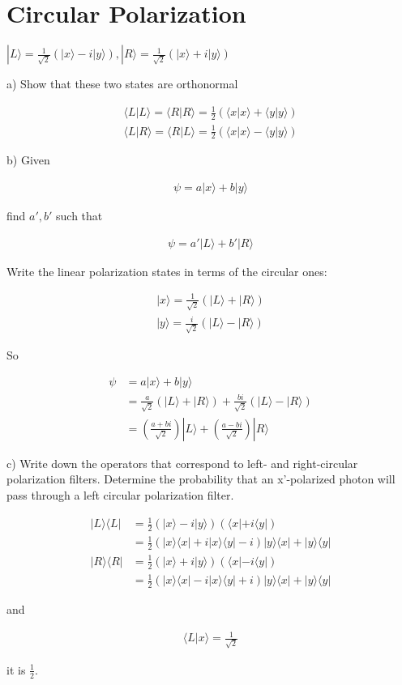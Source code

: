 \documentclass{article}
\title{}
\date{}
\newcommand{\half}{\frac{1}{2}}
\newcommand{\<}{\langle}
\renewcommand{\>}{\rangle}
\begin{document}
\maketitle

\section{Circular Polarization}

$|L\> = \frac{1}{\sqrt 2} (|x\> - i|y\>), |R\> = \frac{1}{\sqrt 2} (|x\> + i|y\>)$

a) Show that these two states are orthonormal

\begin{align*}
\<L|L\> = \<R|R\> = \frac{1}{2} (\<x|x\> + \<y|y\>) \\
\<L|R\> = \<R|L\> = \frac{1}{2} (\<x|x\> - \<y|y\>)
\end{align*}

b) Given 

\begin{align*}
\psi = a|x\> + b|y\>
\end{align*}

find $a', b'$ such that

\begin{align*}
\psi = a'|L\> + b'|R\>
\end{align*}

Write the linear polarization states in terms of the circular ones:

\begin{align*}
|x\> = \frac{1}{\sqrt 2} (|L\> + |R\>) \\
|y\> = \frac{i}{\sqrt 2} (|L\> - |R\>)
\end{align*}

So

\begin{align*}
\psi &= a|x\> + b|y\> \\
&= \frac{a}{\sqrt 2} (|L\> + |R\>) + \frac{bi}{\sqrt 2} (|L\> - |R\>) \\
&= (\frac{a+bi}{\sqrt 2})|L\> + (\frac{a-bi}{\sqrt 2})|R\>
\end{align*}

c) Write down the operators that correspond to left- and right-circular polarization filters. Determine the probability that an x’-polarized photon will pass through a left circular polarization filter.

\begin{align*}
|L\>\<L| &= \half (|x\> - i|y\>)(\<x| + i\<y|) \\
&= \half (|x\>\<x| + i|x\>\<y| - i)|y\>\<x| + |y\>\<y| \\
|R\>\<R| &= \half (|x\> + i|y\>)(\<x| - i\<y|) \\
&= \half (|x\>\<x| - i|x\>\<y| + i)|y\>\<x| + |y\>\<y|
\end{align*}

and

\begin{align*}
\<L|x\> = \frac{1}{\sqrt 2}
\end{align*}

it is $\half$.
\end{document}
